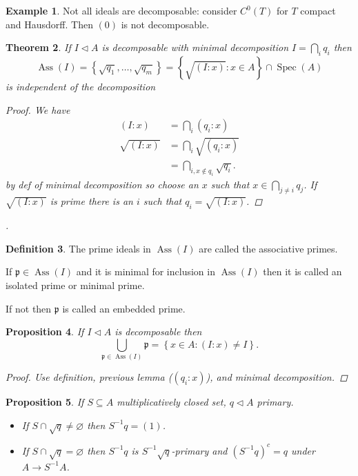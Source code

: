 \documentclass{article}
\newcommand{\set}[1]{\left\{#1\right\}}
\newcommand{\setwith}[2]{\left\{#1:#2\right\}}
\DeclareMathOperator{\Ass}{Ass}
\DeclareMathOperator{\Spec}{Spec}
\newcommand{\primeid}{\mathfrak{p}}
\newcommand{\ideal}{\triangleleft}
\newtheorem{theorem}{Theorem}[section]
\newtheorem{proposition}[theorem]{Proposition}
\theoremstyle{definition}
\newtheorem{definition}[theorem]{Definition}
\newtheorem{example}[theorem]{Example}
\begin{document}
\begin{example}
    Not all ideals are decomposable: consider \(C^{0}(T)\) for \(T\) compact and
    Hausdorff. Then \((0)\) is not decomposable.
\end{example}

\begin{theorem}
    If \(I\ideal A\) is decomposable with minimal decomposition
    \(I=\bigcap_{i}q_{i}\) then
    \[
        \Ass(I)=\set{\sqrt{q_{1}},\ldots,\sqrt{q_{m}}}=\setwith{\sqrt{(I:x)}}{x\in A}\cap\Spec(A)
    \]
    is independent of the decomposition

    \begin{proof}
        We have
        \begin{align*}
            (I:x)        & =\bigcap_{i}(q_{i}:x)                   \\
            \sqrt{(I:x)} & =\bigcap_{i}\sqrt{(q_{i}:x)}            \\
                         & =\bigcap_{i,x\notin q_{i}}\sqrt{q_{i}}.
        \end{align*}
        by def of minimal decomposition so choose an \(x\) such that
        \(x\in\bigcap_{j\neq i}q_{j}\). If \(\sqrt{(I:x)}\) is prime there is an
        \(i\) such that \(q_{i}=\sqrt{(I:x)}\).
    \end{proof}.
\end{theorem}

\begin{definition}
    The prime ideals in \(\Ass(I)\) are called the associative primes.

    If \(\primeid\in\Ass(I)\) and it is minimal for inclusion in \(\Ass(I)\)
    then it is called an isolated prime or minimal prime.

    If not then \(\primeid\) is called an embedded prime.
\end{definition}

\begin{proposition}
    If \(I\ideal A\) is decomposable then
    \[
        \bigcup_{\primeid\in\Ass(I)}\primeid=\setwith{x\in A}{(I:x)\neq I}.
    \]

    \begin{proof}
        Use definition, previous lemma (\((q_{i}:x)\)), and minimal decomposition.
    \end{proof}
\end{proposition}

\begin{proposition}
    If \(S\subseteq A\) multiplicatively closed set, \(q\ideal A\) primary.
    \begin{itemize}
        \item If \(S\cap\sqrt{q}\neq\varnothing\) then \(S^{-1}q=(1)\).
        \item If \(S\cap\sqrt{q}=\varnothing\) then \(S^{-1}q\) is
              \(S^{-1}\sqrt{q}\)-primary and \((S^{-1}q)^{c}=q\) under \(A\to
              S^{-1}A\).
    \end{itemize}
\end{proposition}
\end{document}
